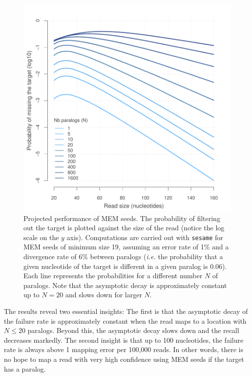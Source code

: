 \documentclass[english]{article}
\begin{document}
\begin{figure}[h]
\begin{center}
\includegraphics[scale=.6]{MEM_19.pdf}
\end{center}
\caption{Projected performance of MEM seeds. The probability of filtering
out the target is plotted against the size of the read (notice the log
scale on the $y$ axis). Computations are carried out with \texttt{sesame}
for MEM seeds of minimum size 19, assuming an error rate of 1\% and a
divergence rate of 6\% between paralogs (\textit{i.e.} the probability
that a given nucleotide of the target is different in a given paralog is
0.06). Each line represents the probabilities for a different number $N$
of paralogs. Note that the asymptotic decay is approximately constant up
to $N = 20$ and slows down for larger $N$.}
\label{fig_MEM}
\end{figure}

The results reveal two essential insights: The first is that the
asymptotic decay of the failure rate is approximately constant when the
read maps to a location with $N \leq 20$ paralogs. Beyond this, the
asymptotic decay slows down and the recall decreases markedly. The second
insight is that up to 100 nucleotides, the failure rate is always above 1
mapping error per 100,000 reads. In other words, there is no hope to map a
read with very high confidence using MEM seeds if the target has a
paralog.
\end{document}
